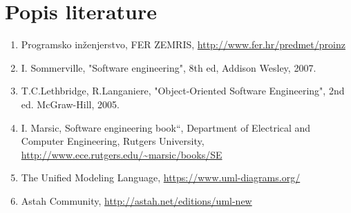 \chapter*{Popis literature}
	 	
		
		\begin{enumerate}
			
			
			\item  Programsko inženjerstvo, FER ZEMRIS, \url{http://www.fer.hr/predmet/proinz}
			
			\item  I. Sommerville, "Software engineering", 8th ed, Addison Wesley, 2007.
			
			\item  T.C.Lethbridge, R.Langaniere, "Object-Oriented Software Engineering", 2nd ed. McGraw-Hill, 2005.
			
			\item  I. Marsic, Software engineering book``, Department of Electrical and Computer Engineering, Rutgers University, \url{http://www.ece.rutgers.edu/~marsic/books/SE}
			
			\item  The Unified Modeling Language, \url{https://www.uml-diagrams.org/}
			
			\item  Astah Community, \url{http://astah.net/editions/uml-new}
			
		\end{enumerate}
		
		 